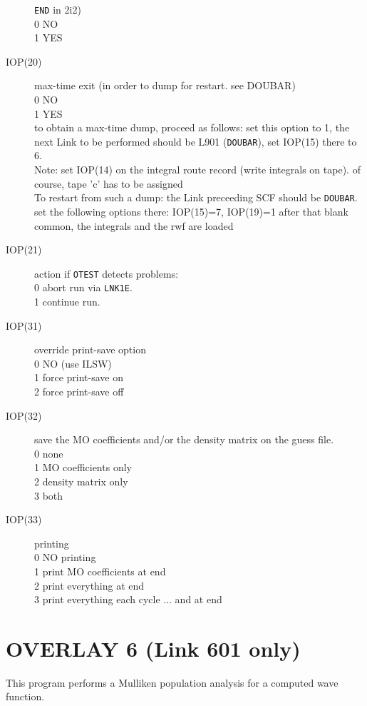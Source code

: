 \begin{description}
{\tt END} in 2i2)  \\
0  NO \\
1  YES \\
\item[IOP(20)]  max-time exit (in order to dump for restart. see
DOUBAR)  \\
0  NO \\
1  YES \\
to obtain a max-time dump, proceed as follows:
set this option to 1,
the next Link to be performed should be L901 ({\tt DOUBAR}),
set IOP(15) there to 6.  \\
Note: set IOP(14) on the integral route record (write integrals on
tape). of course, tape 'c' has to be assigned  \\
To restart from such a dump:
the Link preceeding SCF should be {\tt DOUBAR}.
set the following options there: IOP(15)=7, IOP(19)=1
after that blank common, the integrals and the rwf are loaded
\item[IOP(21)]  action if {\tt OTEST} detects problems:  \\
0  abort run via {\tt LNK1E}. \\
1  continue run. \\
\item[IOP(31)]  override print-save option  \\
0  NO (use ILSW) \\
1  force print-save on \\
2  force print-save off \\
\item[IOP(32)]  save the MO coefficients and/or the density
matrix on the guess file.  \\
0  none \\
1  MO coefficients only \\
2  density matrix only \\
3  both \\
\item[IOP(33)]  printing  \\
0  NO printing \\
1  print MO coefficients at end \\
2  print everything at end \\
3  print everything each cycle ... and at end \\
\end{description}
\section{\sf OVERLAY 6 (Link 601 only)}
This program performs a Mulliken population analysis for 
a computed wave
function.
